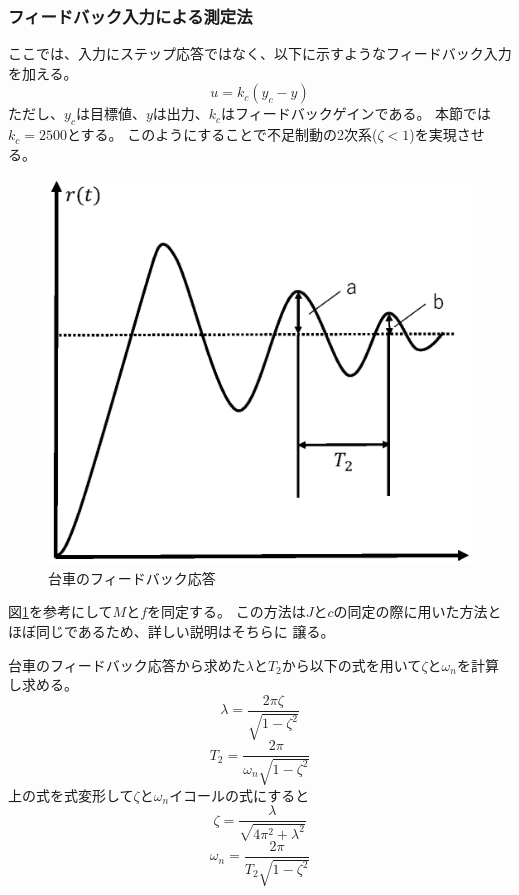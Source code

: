 	\subsubsection{フィードバック入力による測定法}
		ここでは、入力にステップ応答ではなく、以下に示すようなフィードバック入力を加える。
		\begin{equation}
			u = k_{c}(y_{c} - y)
		\end{equation}
		ただし、$y_c$は目標値、$y$は出力、$k_{c}$はフィードバックゲインである。
		本節では$k_c=2500$とする。
		このようにすることで不足制動の2次系($\zeta<1$)を実現させる。
		\begin{figure}[H]
			\centering
			\includegraphics[width=0.6\linewidth]{gazo/feedback.eps}
			\caption{台車のフィードバック応答}
			\label{image:parameterMFfeed}
		\end{figure}
		図\ref{image:parameterMFfeed}を参考にして$M$と$f$を同定する。
		この方法は$J$と$c$の同定の際に用いた方法とほぼ同じであるため、詳しい説明はそちらに
		譲る。
		\par
		台車のフィードバック応答から求めた$\lambda$と$T_2$から以下の式を用いて$\zeta$と$\omega_{n}$を計算し求める。
		\begin{equation}
			\lambda=\frac{2\pi\zeta}{\sqrt{1-\zeta^{2}}}
		\end{equation}
		\begin{equation}
			T_{2}=\frac{2\pi}{\omega_{n}\sqrt{1-\zeta^{2}}}
		\end{equation}
		上の式を式変形して$\zeta$と$\omega_{n}$イコールの式にすると
		\begin{equation}
			\zeta=\frac{\lambda}{\sqrt{4\pi^{2}+\lambda^{2}}}
		\end{equation}
		\begin{equation}
			\omega_{n}=\frac{2\pi}{T_{2}\sqrt{1-\zeta^{2}}}
		\end{equation}
